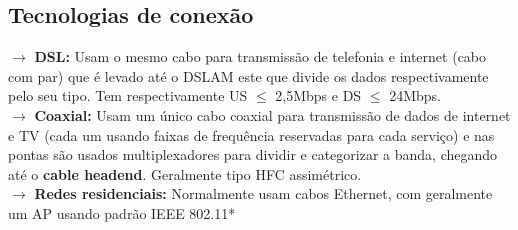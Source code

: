 \documentclass[12pt]{article}
\begin{document}
    \subsection{Tecnologias de conexão}
    $\rightarrow$ \textbf{DSL:} Usam o mesmo cabo para transmissão de telefonia e internet (cabo com par) que é levado até o DSLAM este que divide os dados respectivamente pelo seu tipo. Tem respectivamente US $\leq$ 2,5Mbps e DS $\leq$ 24Mbps.
    \\$\rightarrow$ \textbf{Coaxial:} Usam um único cabo coaxial para transmissão de dados de internet e TV (cada um usando faixas de frequência reservadas para cada serviço) e nas pontas são usados multiplexadores para dividir e categorizar a banda, chegando até o \textbf{cable headend}. Geralmente tipo HFC assimétrico.
    \\$\rightarrow$ \textbf{Redes residenciais:} Normalmente usam cabos Ethernet, com geralmente um AP usando padrão IEEE 802.11*


\end{document}
